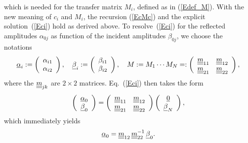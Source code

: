 which is needed for the transfer matrix $M_i$,
defined as in (\ref{Edef_M}).
With the new meaning of $c_i$ and $M_i$,
the recursion (\ref{EcMc}) and the explicit solution~(\ref{Eci})
hold as derived above.
To resolve~(\ref{Eci}) for the reflected amplitudes $\alpha_{0j}$
as function of the incident amplitudes $\beta_{0j}$,
we choose the notations
\begin{equation}
  \underline{\alpha}_i
  :=\left(\begin{array}{c}\alpha_{i1}\\\alpha_{i2}\end{array}\right),\quad
  \underline{\beta}_i
  :=\left(\begin{array}{c}\beta_{i1}\\\beta_{i2}\end{array}\right),\quad
  M:=M_1\cdots M_N
  =:\left(\begin{array}{cc}\underline{\underline{m}}_{11}&\underline{\underline{m}}_{12}\\
                           \underline{\underline{m}}_{21}&\underline{\underline{m}}_{22}\end{array}\right),
\end{equation}
where the $\underline{\underline{m}}_{jk}$ are $2\times2$ matrices.
Eq.~(\ref{Eci}) then takes the form
\begin{equation}
  \left(\begin{array}{c}\underline{\alpha}_{0}\\\underline{\beta}_{0}\end{array}\right)
  = 
  \left(\begin{array}{cc}\underline{\underline{m}}_{11}&\underline{\underline{m}}_{12}\\
    \underline{\underline{m}}_{21}&\underline{\underline{m}}_{22}\end{array}\right)
  \left(\begin{array}{c}\underline{0}\\\underline{\beta}_{N}\end{array}\right),
\end{equation}
which immediately yields
\begin{equation}
  \underline{\alpha}_0 = \underline{\underline{m}}_{12}\,\underline{\underline{m}}_{22}^{-1}\,\underline{\beta}_0.
\end{equation}
